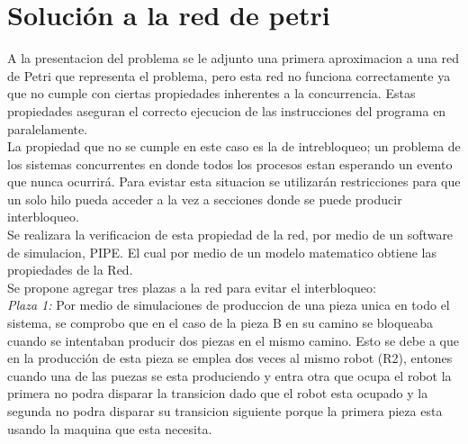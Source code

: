 \documentclass[10pt, a4paper,notitlepage]{article}
\begin{document}
\section{Solución a la red de petri}
A la presentacion del problema se le adjunto una primera aproximacion a una red de Petri que representa el problema, pero esta red no funciona correctamente ya que no cumple con ciertas propiedades inherentes a la concurrencia. Estas propiedades aseguran el correcto ejecucion de las instrucciones del programa en paralelamente.\\
La propiedad que no se cumple en este caso es la de intrebloqueo; un problema de los sistemas concurrentes en donde todos los procesos estan esperando un evento que nunca ocurrirá. Para evistar esta situacion se utilizarán restricciones para que un solo hilo pueda acceder a la vez a secciones donde se puede producir interbloqueo.
\\
Se realizara la verificacion de esta propiedad de la red, por medio de un software de simulacion, PIPE. El cual por medio de un modelo matematico obtiene las propiedades de la Red.\\
Se propone agregar tres plazas a la red para evitar el interbloqueo:
\\
\textit{Plaza 1:}
Por medio de simulaciones de produccion de una pieza unica en todo el sistema, se comprobo que en el caso de la pieza B en su camino se bloqueaba cuando se intentaban producir dos piezas en el mismo camino. Esto se debe a que en la producción de esta pieza se emplea dos veces al mismo robot (R2), entones cuando una de las puezas se esta produciendo y entra otra que ocupa el robot la primera no podra disparar la transicion dado que el robot esta ocupado y la segunda no podra disparar su transicion siguiente porque la primera pieza esta usando la maquina que esta necesita.
\end{document}
